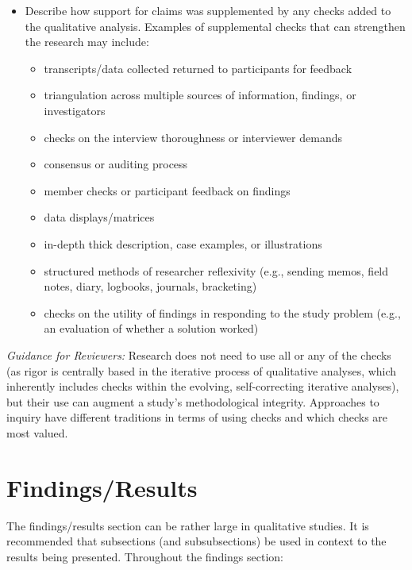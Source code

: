 \documentclass[acmsmall,screen,anonymous,review]{acmart}
\begin{document}
\begin{itemize}
    \item Describe how support for claims was supplemented by any checks added to the qualitative
    analysis. Examples of supplemental checks that can strengthen the research may include:
        \begin{itemize}
            \item transcripts/data collected returned to participants for feedback
            \item  triangulation across multiple sources of information, findings, or investigators
            \item  checks on the interview thoroughness or interviewer demands
            \item  consensus or auditing process
            \item  member checks or participant feedback on findings
            \item  data displays/matrices
            \item  in-depth thick description, case examples, or illustrations
            \item  structured methods of researcher reflexivity (e.g., sending memos, field notes, diary,
            logbooks, journals, bracketing)
            \item  checks on the utility of findings in responding to the study problem (e.g., an evaluation of
            whether a solution worked)
        \end{itemize}
\end{itemize}
 
\textit{Guidance for Reviewers:} Research does not need to use all or any of the checks (as rigor is centrally based in the iterative process of qualitative analyses, which inherently includes checks within the evolving, self-correcting iterative analyses), but their use can augment a study’s methodological integrity. Approaches to inquiry have different traditions in terms of using
checks and which checks are most valued.

\section{Findings/Results}

The findings/results section can be rather large in qualitative studies. It is recommended that subsections (and subsubsections) be used in context to the results being presented. Throughout the findings section:
\end{document}
